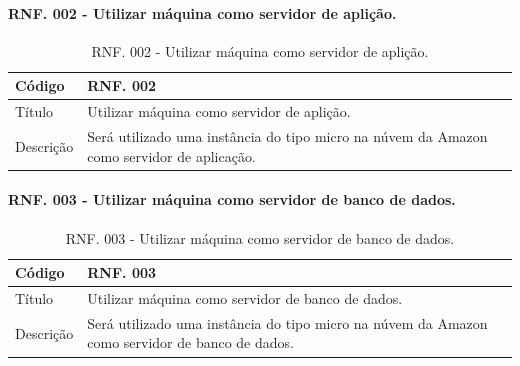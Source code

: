 \documentclass[11pt]{article}
\begin{document}
      \paragraph{RNF. 002 - Utilizar máquina como servidor de aplição.} \hspace{10pt}

      \begin{table}[h]
        \begin{center}
          \begin{tabular}{ | p{5cm} | p{10cm} | }
            \hline
            Código\cellcolor{gray} & RNF. 002\cellcolor{gray} \\
            \hline
            Título & Utilizar máquina como servidor de aplição. \\
            \hline
            Descrição & Será utilizado uma instância do tipo micro na núvem da Amazon como servidor de aplicação. \\
            \hline
          \end{tabular}
          \caption{RNF. 002 - Utilizar máquina como servidor de aplição.}
        \end{center}
      \end{table}

  \newpage

      \paragraph{RNF. 003 - Utilizar máquina como servidor de banco de dados.} \hspace{10pt}

      \begin{table}[h]
        \begin{center}
          \begin{tabular}{ | p{5cm} | p{10cm} | }
            \hline
            Código\cellcolor{gray} & RNF. 003\cellcolor{gray} \\
            \hline
            Título & Utilizar máquina como servidor de banco de dados. \\
            \hline
            Descrição & Será utilizado uma instância do tipo micro na núvem da Amazon como servidor de banco de dados. \\
            \hline
          \end{tabular}
          \caption{RNF. 003 - Utilizar máquina como servidor de banco de dados.}
        \end{center}
      \end{table}
\end{document}
